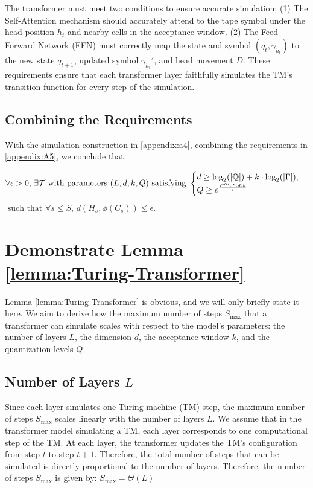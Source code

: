 The transformer must meet two conditions to ensure accurate simulation:
(1) The Self-Attention mechanism should accurately attend to the tape symbol under the head position \( h_t \) and nearby cells in the acceptance window.
(2) The Feed-Forward Network (FFN) must correctly map the state and symbol \( (q_t, \gamma_{h_t}) \) to the new state \( q_{t+1} \), updated symbol \( \gamma_{h_t}' \), and head movement \( D \).
These requirements ensure that each transformer layer faithfully simulates the TM's transition function for every step of the simulation.

\subsection{{\color{black}Combining} the Requirements}
With the simulation construction in \ref{appendix:a4}, {\color{black}combining} the requirements in \ref{appendix:A5}, we conclude that:


\[
\forall \epsilon > 0, \, \exists \mathcal{T} \text{ with parameters } (L, d, k, Q) \text{ satisfying } 
\begin{cases}
{\color{black} d \geq \log_2(|\mathbb{Q}|) + k \cdot \log_2(|\Gamma|), }\\
\color{black}Q \geq e^{\frac{C''' \cdot L \cdot d \cdot k}{\varepsilon}}
\end{cases}\]\(
\text{ such that } \forall s \leq S, \, d(H_s, \phi(C_s)) \leq \epsilon.
\)


\section{Demonstrate Lemma \ref{lemma:Turing-Transformer}}
\label{appendix:b}
{
\color{black} Lemma \ref{lemma:Turing-Transformer} is obvious, and we will only briefly state it here.
}
We aim to derive how the maximum number of steps \( S_{\text{max}} \) that a transformer can simulate scales with respect to the model's parameters: the number of layers \( L \), the dimension \( d \), the acceptance window \( k \), and the quantization levels \( Q \).

\subsection{Number of Layers \( L \)}

Since each layer simulates one Turing machine (TM) step, the maximum number of steps \( S_{\text{max}} \) scales linearly with the number of layers \( L \). We assume that in the transformer model simulating a TM, each layer corresponds to one computational step of the TM. At each layer, the transformer updates the TM's configuration from step \( t \) to step \( t+1 \). Therefore, the total number of steps that can be simulated is directly proportional to the number of layers. Therefore, the number of steps \( S_{\text{max}} \) is given by: \(
S_{\text{max}} = \Theta(L)
\)

